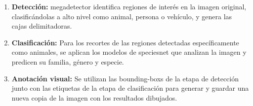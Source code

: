 \documentclass[a4paper, 12pt]{report}
\begin{document}
\begin{enumerate}
  \item \textbf{Detección:} \gls{megadetector} identifica regiones de interés en la imagen original, clasificándolas a alto nivel como animal, persona o vehículo, y genera las cajas delimitadoras.
  \item \textbf{Clasificación:} Para los recortes de las regiones detectadas específicamente como animales, se aplican los modelos de \gls{speciesnet} que analizan la imagen y predicen su familia, género y especie.
  \item \textbf{Anotación visual:} Se utilizan las \glspl{bounding-box} de la etapa de detección junto con las etiquetas de la etapa de clasificación para generar y guardar una nueva copia de la imagen con los resultados dibujados.
\end{enumerate}
\end{document}
